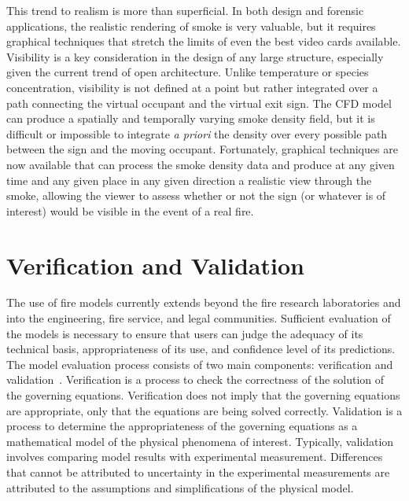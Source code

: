 \documentclass[graybox]{svmult}
\begin{document}
This trend to realism is more than superficial. In both design and forensic applications, the realistic rendering of smoke is very valuable, but it requires graphical techniques that stretch the limits of even the best video cards available. Visibility is a key consideration in the design of any large structure, especially given the current trend of open architecture. Unlike temperature or species concentration, visibility is not defined at a point but rather integrated over a path connecting the virtual occupant and the virtual exit sign. The CFD model can produce a spatially and temporally varying smoke density field, but it is difficult or impossible to integrate {\em a priori} the density over every possible path between the sign and the moving occupant. Fortunately, graphical techniques are now available that can process the smoke density data and produce at any given time and any given place in any given direction a realistic view through the smoke, allowing the viewer to assess whether or not the sign (or whatever is of interest) would be visible in the event of a real fire.






\section{Verification and Validation}

The use of fire models currently extends beyond the fire research laboratories and into the engineering, fire service, and legal communities. Sufficient evaluation of the models is necessary to ensure that users can judge the adequacy of its technical basis, appropriateness of its use, and confidence level of its predictions. The model evaluation process consists of two main components: verification and validation~\cite{ASTM:E1355}. Verification is a process to check the correctness of the solution of the governing equations. Verification does not imply that the governing equations are appropriate, only that the equations are being solved correctly. Validation is a process to determine the appropriateness of the governing equations as a mathematical model of the physical phenomena of interest. Typically, validation involves comparing model results with experimental measurement. Differences that cannot be attributed to uncertainty in the experimental measurements are attributed to the assumptions and simplifications of the physical model.
\end{document}
